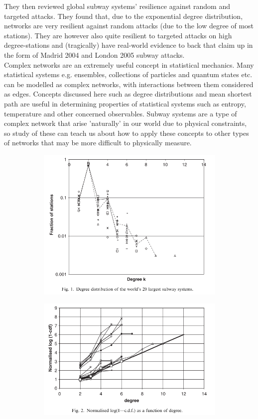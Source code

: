 \documentclass[11pt]{article}
\begin{document}
They then reviewed global subway systems’ resilience against random and targeted attacks. They found that, due to the exponential degree distribution, networks are very resilient against random attacks (due to the low degree of most stations). They are however also quite resilient to targeted attacks on high degree-stations and (tragically) have real-world evidence to back that claim up in the form of Madrid 2004 and London 2005 subway attacks.\\

Complex networks are an extremely useful concept in statistical mechanics. Many statistical systems e.g. ensembles, collections of particles and quantum states etc. can be modelled as complex networks, with interactions between them considered as edges. Concepts discussed here such as degree distributions and mean shortest path are useful in determining properties of statistical systems such as entropy, temperature and other concerned observables. Subway systems are a type of complex network that arise 'naturally' in our world due to physical constraints, so study of these can teach us about how to apply these concepts to other types of networks that may be more difficult to physically measure.

\begin{figure}[h]
	\begin{subfigure}{0.5\textwidth}
		\centering
		\includegraphics[scale=1]{Stickland_q3_fig1.png}
	\end{subfigure}
	\begin{subfigure}{0.5\textwidth}
		\centering
		\includegraphics[scale=1]{Stickland_q3_fig2.png}
	\end{subfigure}
\end{figure}
\end{document}
